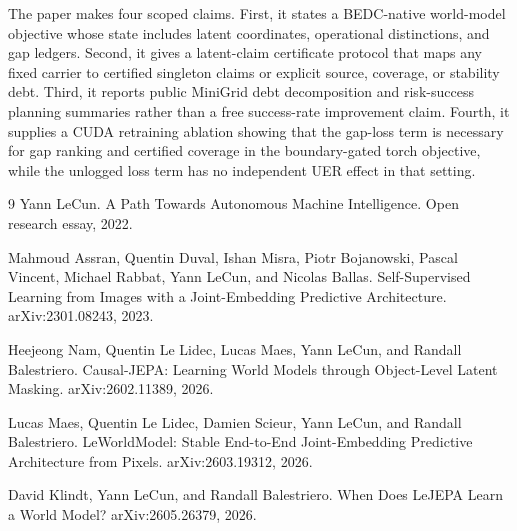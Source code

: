 \documentclass[11pt]{article}
\begin{document}
The paper makes four scoped claims.  First, it states a BEDC-native
world-model objective whose state includes latent coordinates, operational
distinctions, and gap ledgers.  Second, it gives a latent-claim certificate
protocol that maps any fixed carrier to certified singleton claims or
explicit source, coverage, or stability debt.  Third, it reports public
MiniGrid debt decomposition and risk-success planning summaries rather than a
free success-rate improvement claim.  Fourth, it supplies a CUDA retraining
ablation showing that the gap-loss term is necessary for gap ranking and
certified coverage in the boundary-gated torch objective, while the unlogged
loss term has no independent UER effect in that setting.













\begin{thebibliography}{9}
Yann LeCun.
\newblock A Path Towards Autonomous Machine Intelligence.
\newblock Open research essay, 2022.

Mahmoud Assran, Quentin Duval, Ishan Misra, Piotr Bojanowski, Pascal Vincent,
Michael Rabbat, Yann LeCun, and Nicolas Ballas.
\newblock Self-Supervised Learning from Images with a Joint-Embedding
Predictive Architecture.
\newblock arXiv:2301.08243, 2023.

Heejeong Nam, Quentin Le Lidec, Lucas Maes, Yann LeCun, and Randall
Balestriero.
\newblock Causal-JEPA: Learning World Models through Object-Level Latent
Masking.
\newblock arXiv:2602.11389, 2026.

Lucas Maes, Quentin Le Lidec, Damien Scieur, Yann LeCun, and Randall
Balestriero.
\newblock LeWorldModel: Stable End-to-End Joint-Embedding Predictive
Architecture from Pixels.
\newblock arXiv:2603.19312, 2026.

David Klindt, Yann LeCun, and Randall Balestriero.
\newblock When Does LeJEPA Learn a World Model?
\newblock arXiv:2605.26379, 2026.
\end{thebibliography}
\end{document}
